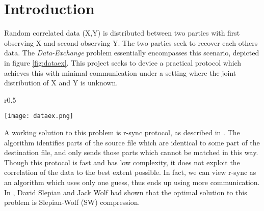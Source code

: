 \documentclass[
11pt, %
a4paper, %
oneside, %
headinclude,footinclude, %
BCOR5mm, %
]{scrartcl}
\begin{document}
\newpage
\section{Introduction}\label{intro}
Random correlated data (X,Y) is distributed between two parties with first observing X and second observing Y. The two parties seek to recover each others data. The \emph{Data-Exchange} problem essentially encompasses this scenario,  depicted in figure \ref{fig:dataex}. This project seeks to device a practical protocol which achieves this with minimal communication under a setting where the joint distribution of X and Y is unknown.\\
\begin{wrapfigure}{r}{0.5\textwidth}
  \begin{center}
    \texttt{[image: dataex.png]}
  \end{center}
  \caption{The Data-Exchange problem}
  \label{fig:dataex}
\end{wrapfigure}
A working solution to this problem is r-sync protocol, as described in   \cite{rsync}. The algorithm identifies parts of the source file which are identical to some part of the destination file, and only sends those parts which cannot be matched in this way. Though this protocol is fast and has low complexity, it does not exploit the correlation of the data to the best extent possible. In fact, we can view r-sync as an algorithm which uses only one guess,  thus ends up using more communication.\\
In \cite{sw}, David Slepian and Jack Wolf had shown that the optimal solution to this problem is Slepian-Wolf (SW) compression. 
\end{document}
